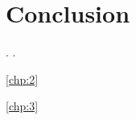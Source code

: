 \documentclass[../Dissertation]{subfiles}
\begin{document}
\section{Conclusion}\label{subsec:overallConclusion}
    \lipsum[64] \cite{Gandorfer_2001} \lipsum[64] \cite{Sebag_1987}.
    \lipsum[64] \cite{Kang_2008}.  \lipsum[64] \cite{Harocopos_2004,
    Simel_2008} \lipsum[64]
    
    \lipsum[64] \cite{Gan_2018} \lipsum[64] \cite{Sebag_1991} \lipsum[64]
    
    \lipsum[64] \cref{chp:2} \lipsum[64]
    
    \lipsum[64] \cref{chp:3} \lipsum[64]
    \cite{Kinloch_2002} \lipsum[64]
    
    \lipsum[64]
    
\end{document}
